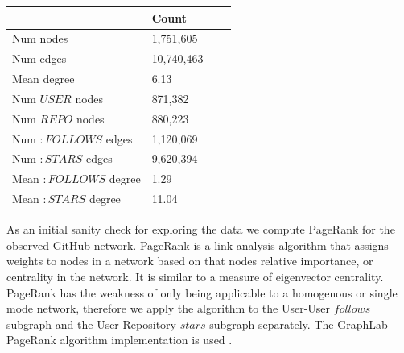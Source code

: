 \begin{table}[ht]
\centering
\small\renewcommand{\arraystretch}{1.4}  
%
\label{dataset_stats}
\begin{tabularx}{0.7\textwidth}{lXXX}
\hline
\rowcolor{tableheadcolor}
 & Count \\
\hline
Num nodes &   1,751,605 \\
Num edges & 10,740,463 \\
Mean degree & 6.13 \\
Num $USER$ nodes & 871,382  \\
Num $REPO$ nodes &  880,223\\
Num $:FOLLOWS$ edges & 1,120,069 \\
Num $:STARS$ edges & 9,620,394 \\
Mean $:FOLLOWS$ degree & 1.29 \\
Mean $:STARS$ degree & 11.04 \\
\hline
\hline
\end{tabularx}
\end{table}

As an initial sanity check for exploring the data we compute PageRank for the observed GitHub network. PageRank is a link analysis algorithm that assigns weights to nodes in a network based on that nodes relative importance, or centrality in the network. \cite{pagerank} It is similar to a measure of eigenvector centrality. PageRank has the weakness of only being applicable to a homogenous or single mode network, therefore we apply the algorithm to the User-User $follows$ subgraph and the User-Repository $stars$ subgraph separately. The GraphLab PageRank algorithm implementation is used \cite{GraphLab}.

